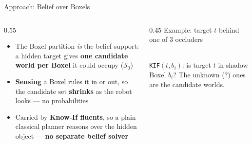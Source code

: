 \documentclass[aspectratio=169, 11pt]{beamer}
\begin{document}
\begin{frame}{Approach: Belief over Boxels}
  \begin{columns}[T]
    \begin{column}{0.55\textwidth}
      \begin{itemize}[<+->]
        \item The Boxel partition \emph{is} the belief support: a hidden target
              gives \textbf{one candidate world per Boxel} it could occupy
              ($\mathcal{S}_0$)
        \item \textbf{Sensing} a Boxel rules it in or out, so the candidate set
              \textbf{shrinks} as the robot looks --- no probabilities
        \item Carried by \textbf{Know-If fluents}, so a plain classical planner
              reasons over the hidden object --- \textbf{no separate belief solver}
      \end{itemize}
    \end{column}
    \begin{column}{0.45\textwidth}
      \centering
      {\footnotesize Example: target $t$ behind one of 3 occluders}\\[1.5mm]
      \\[1.5mm]
      {\scriptsize\color{gray} \texttt{KIF}$(t,b_i)$: is target $t$ in shadow
       Boxel $b_i$? The unknown ($?$) ones are the candidate worlds.}
    \end{column}
  \end{columns}
\end{frame}
\end{document}
